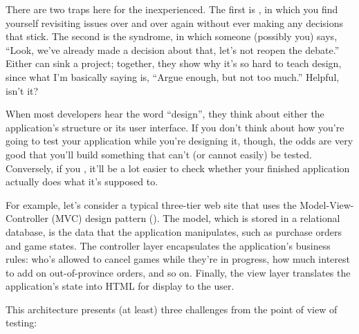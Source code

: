 \documentclass{report}
\begin{document}
There are two traps here for the inexperienced.  The first is
, in which you find yourself revisiting
issues over and over again without ever making any decisions that
stick.  The second is the  syndrome, in
which someone (possibly you) says, ``Look, we've already made a
decision about that, let's not reopen the debate.''  Either can sink a
project; together, they show why it's so hard to teach design, since
what I'm basically saying is, ``Argue enough, but not too much.''
Helpful, isn't it?


When most developers hear the word ``design'', they think about either
the application's structure or its user interface.  If you don't think
about how you're going to test your application while you're designing
it, though, the odds are very good that you'll build something that
can't (or cannot easily) be tested.  Conversely, if you
, it'll be a lot easier to check whether your
finished application actually does what it's supposed to.

For example, let's consider a typical three-tier web site that uses
the Model-View-Controller (MVC) design pattern
().  The model, which is stored in a relational
database, is the data that the application manipulates, such as
purchase orders and game states.  The controller layer encapsulates
the application's business rules: who's allowed to cancel games while
they're in progress, how much interest to add on out-of-province
orders, and so on.  Finally, the view layer translates the
application's state into HTML for display to the user.

\begin{figure}
\end{figure}

This architecture presents (at least) three challenges from the point
of view of testing:
\end{document}
